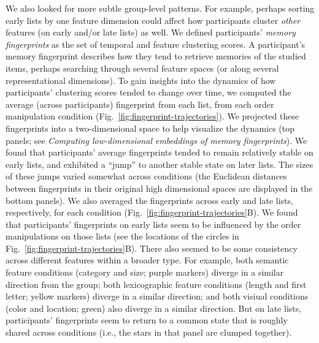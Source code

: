 \documentclass[11pt]{article}
\begin{document}
We also looked for more subtle group-level patterns. For example, perhaps
sorting early lists by one feature dimension could affect how participants
cluster \textit{other} features (on early and/or late lists) as well. We
defined participants' \textit{memory fingerprints} as the set of temporal and
feature clustering scores. A participant's memory fingerprint describes how
they tend to retrieve memories of the studied items, perhaps searching through
several feature spaces (or along several representational dimensions). To gain
insights into the dynamics of how participants' clustering scores tended to
change over time, we computed the average (across participants) fingerprint
from each list, from each order manipulation condition
(Fig.~\ref{fig:fingerprint-trajectories}). We projected these fingerprints into
a two-dimensional space to help visualize the dynamics (top panels; see
\textit{Computing low-dimensional embeddings of memory fingerprints}). We found
that participants' average fingerprints tended to remain relatively stable on
early lists, and exhibited a ``jump'' to another stable state on later lists.
The sizes of these jumps varied somewhat across conditions (the Euclidean
distances between fingerprints in their original high dimensional spaces are
displayed in the bottom panels). We also averaged the fingerprints across early
and late lists, respectively, for each condition
(Fig.~\ref{fig:fingerprint-trajectories}B). We found that participants'
fingerprints on early lists seem to be influenced by the order manipulations on
those lists (see the locations of the circles in
Fig.~\ref{fig:fingerprint-trajectories}B). There also seemed to be some
consistency across different features within a broader type. For example, both
semantic feature conditions (category and size; purple markers) diverge in a
similar direction from the group; both lexicographic feature conditions (length
and first letter; yellow markers) diverge in a similar direction; and both
visiual conditions (color and location; green) also diverge in a similar
direction. But on late lists, participants' fingerprints seem to return to a
common state that is roughly shared across conditions (i.e., the stars in that
panel are clumped together).
\end{document}
